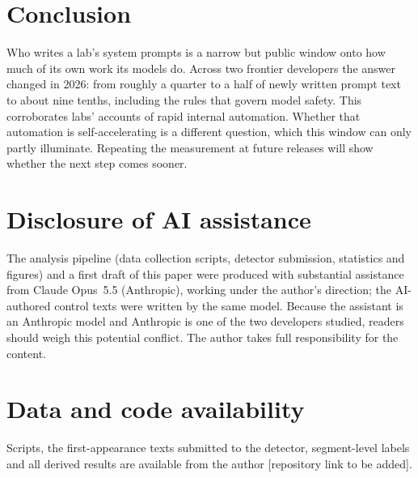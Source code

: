 \documentclass[11pt]{article}
\begin{document}
\section{Conclusion}

Who writes a lab's system prompts is a narrow but public window onto how much of its own work its models do. Across two frontier developers the answer changed in 2026: from roughly a quarter to a half of newly written prompt text to about nine tenths, including the rules that govern model safety. This corroborates labs' accounts of rapid internal automation. Whether that automation is self-accelerating is a different question, which this window can only partly illuminate. Repeating the measurement at future releases will show whether the next step comes sooner.

\section*{Disclosure of AI assistance}
The analysis pipeline (data collection scripts, detector submission, statistics and figures) and a first draft of this paper were produced with substantial assistance from Claude Opus~5.5 (Anthropic), working under the author's direction; the AI-authored control texts were written by the same model. Because the assistant is an Anthropic model and Anthropic is one of the two developers studied, readers should weigh this potential conflict. The author takes full responsibility for the content.

\section*{Data and code availability}
Scripts, the first-appearance texts submitted to the detector, segment-level labels and all derived results are available from the author [repository link to be added].




\appendix
\end{document}
